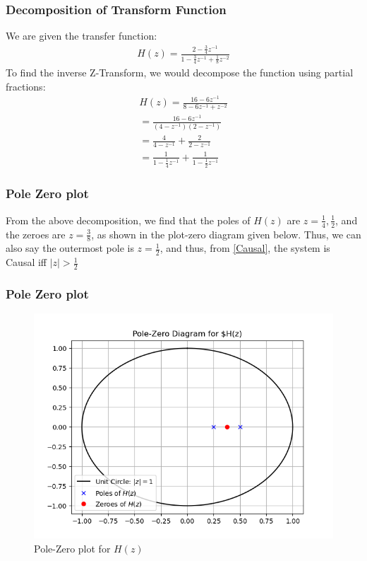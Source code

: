 \documentclass{beamer}
\providecommand{\abs}[1]{\left\vert#1\right\vert}
\begin{document}
\begin{frame}
    \frametitle{Decomposition of Transform Function}
    \begin{flushleft}
     We are given the transfer function:
\begin{align}
    H(z) = \frac{2 - \frac{3}{4}z^{-1}}{1 - \frac{3}{4}z^{-1} + \frac{1}{8}z^{-2}}
\end{align}
To find the inverse Z-Transform, we would decompose the function using partial fractions:
\begin{align}
    H(z) = \frac{16 - 6z^{-1}}{8 - 6z^{-1} + z^{-2}}\\
     = \frac{16 - 6z^{-1}}{(4 - z^{-1})(2 - {z^{-1}})}\\
      = \frac{4}{4 - z^{-1}} +\frac{2}{2 - z^{-1}}\\
       = \frac{1}{1 - \frac{1}{4}z^{-1}} + \frac{1}{1 - \frac{1}{2}z^{-1}}
       \label{partial-fraction}
\end{align}
  \end{flushleft}
\end{frame}

\begin{frame}
    \frametitle{Pole Zero plot}
    \begin{flushleft}
    From the above decomposition, we find that the poles of $H(z)$ are $z = \frac{1}{4} , \frac{1}{2}$, and the zeroes are $z = \frac{3}{8}$, as shown in the plot-zero diagram given below.
Thus, we can also say the outermost pole is $z = \frac{1}{2}$, and thus, from \eqref{Causal}, the system is Causal iff $\abs{z} > \frac{1}{2}$
\end{flushleft}
\end{frame}


\begin{frame}
    \frametitle{Pole Zero plot}
    \begin{flushleft}
    
\begin{figure}[!ht]
\centering
 \includegraphics[width=\columnwidth]{graphs/Pole-zero.png}
 \caption{Pole-Zero plot for $H(z)$}
 \end{figure}
\end{flushleft}
\end{frame}
\end{document}

